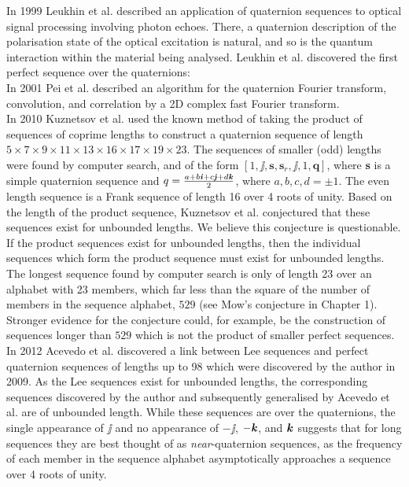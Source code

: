 \documentclass[12pt]{article}
\theoremstyle{definition}
\begin{document}
In 1999 Leukhin et al.\cite{Leukhin1999} described an application of quaternion sequences 
to optical signal processing involving photon echoes. There, a quaternion description of the 
polarisation state of the optical excitation is natural, and so is the quantum interaction within 
the material being analysed. Leukhin et al. discovered the first perfect sequence over the quaternions: 
\leftline{$\left[1+\jj,1+\jj,1+\jj,1+\jj,
        -\frac{1}{2} + \frac{\sqrt{3}\ii}{2} - \frac{\jj}{2} + \frac{\sqrt{3}\kk}{2},
        -\frac{1}{2} -\frac{\sqrt{3}\ii}{2} -\frac{\jj}{2} - \frac{\sqrt{3}\kk}{2},\right.$}
\rightline{$\left. 1+\jj, 
        -\frac{1}{2} - \frac{\sqrt{3} \ii}{2} - \frac{\jj}{2} - \frac{\sqrt{3} \kk}{2},
        -\frac{1}{2} + \frac{\sqrt{3} \ii}{2} - \frac{\jj}{2} + \frac{\sqrt{3} \kk}{2}\right]$} \\

In 2001 Pei et al.\cite{Pei2001} described an algorithm for the quaternion Fourier transform, 
convolution, and correlation by a 2D complex fast Fourier transform. \\

In 2010 Kuznetsov et al.\cite{Kuznetsov2010II} used the known method of taking the product of 
sequences of coprime lengths to construct a quaternion sequence of length
$5\times7\times9\times11\times13\times16\times17\times19\times23$. The sequences of smaller 
(odd) lengths were found by computer search, and of the form 
$[1, \jj, \textbf{s}, \textbf{s}_r, \jj, 1, \textbf{q}]$, where \textbf{s} is a simple quaternion
sequence and $q = \frac{a+b\textbf{\textit{i}}+c\textbf{\textit{j}}+d\textbf{\textit{k}}}{2}$, where $a,b,c,d = \pm 1$. The even length sequence
is a Frank sequence\cite{Frank1962} of length 16 over 4 roots of unity. Based on
the length of the product sequence, Kuznetsov et al. conjectured
that these sequences exist for unbounded lengths. We believe this conjecture is questionable.
If the product sequences exist for unbounded lengths, then the individual sequences which form
the product sequence must exist for unbounded lengths. The longest sequence found by computer 
search is only of length 23 over an alphabet with 23 members, which far less than the square of the number of members in the sequence
alphabet, $529$ (see Mow's conjecture in Chapter 1). Stronger evidence for the conjecture could, 
for example, be the construction of sequences longer than $529$ which is not the product of 
smaller perfect sequences. \\

In 2012 Acevedo et al.\cite{Acevedo2012} discovered a link between Lee sequences\cite{Lee1992} and 
perfect quaternion sequences of lengths up to 98 which were discovered by the author in 2009\cite{SmithMiles2013}. 
As the Lee sequences exist for unbounded lengths, the corresponding sequences 
discovered by the author and subsequently generalised by Acevedo et al. are of unbounded length. While these 
sequences are over the quaternions, the single 
appearance of $\jj$ and no appearance of $-\jj$, $-\textbf{\textit{k}}$, and $\textbf{\textit{k}}$ suggests that for long 
sequences they are best thought of as \textit{near}-quaternion sequences, as the frequency of 
each member in the sequence 
alphabet asymptotically approaches a sequence over 4 roots of unity. \\
\end{document}
